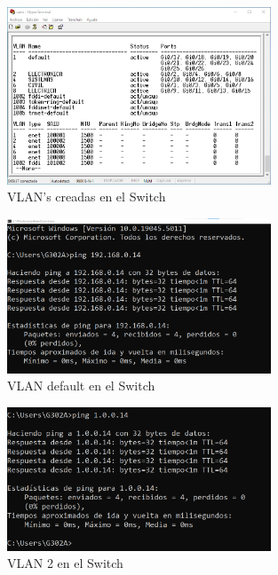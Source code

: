         \begin{figure}[H]
            \centering
            \includegraphics[width=0.7\textwidth]{img/vlansSwitch.png}
            \caption{VLAN's creadas en el Switch}
            \label{fig:vlansSwitch}
        \end{figure}

        \begin{figure}[H]
            \centering
            \includegraphics[width=0.7\textwidth]{img/ping_default.png}
            \caption{VLAN default en el Switch}
            \label{fig:ping_default}
        \end{figure}


        \begin{figure}[H]
            \centering
            \includegraphics[width=0.7\textwidth]{img/ping_vlan2.png}
            \caption{VLAN 2 en el Switch}
            \label{fig:ping_vl an2}
        \end{figure}


